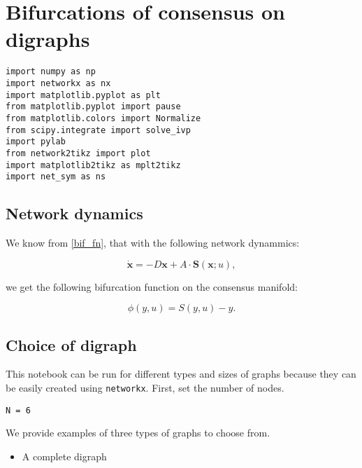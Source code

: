 \hypertarget{bifurcations-of-consensus-on-digraphs}{%
\section{Bifurcations of consensus on
digraphs}\label{bifurcations-of-consensus-on-digraphs}}

\begin{verbatim}
import numpy as np
import networkx as nx
import matplotlib.pyplot as plt
from matplotlib.pyplot import pause
from matplotlib.colors import Normalize
from scipy.integrate import solve_ivp
import pylab
from network2tikz import plot
import matplotlib2tikz as mplt2tikz
import net_sym as ns
\end{verbatim}

\hypertarget{network-dynamics}{%
\subsection{Network dynamics}\label{network-dynamics}}

We know from \cref{bif_fn}, that with the following network dynammics:

\begin{equation}
\dot{\mathbf{x}} = -D\mathbf{x} + A\cdot \mathbf{S}(\mathbf{x};u),
\end{equation}

we get the following bifurcation function on the consensus manifold:

\begin{equation}
\phi(y,u) = S(y,u) - y.
\end{equation}

\hypertarget{choice-of-digraph}{%
\subsection{Choice of digraph}\label{choice-of-digraph}}

This notebook can be run for different types and sizes of graphs because
they can be easily created using \texttt{networkx}. First, set the
number of nodes.

\begin{verbatim}
N = 6
\end{verbatim}

We provide examples of three types of graphs to choose from.

\begin{itemize}
\tightlist
\item
  A complete digraph
\end{itemize}

